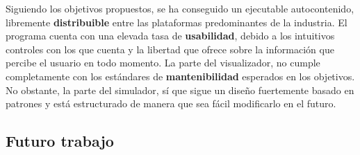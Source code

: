 \documentclass[12pt,a4paper,openright,oneside]{article}
\numberwithin{equation}{section}
\theoremstyle{definition}
\begin{document}
Siguiendo los objetivos propuestos, se ha conseguido un ejecutable autocontenido, libremente \textbf{distribuible} entre las plataformas predominantes de la industria. 
El programa cuenta con una elevada tasa de \textbf{usabilidad}, debido a los intuitivos controles con los que cuenta y la  libertad que ofrece sobre la información que percibe el usuario en todo momento. La parte del visualizador, no cumple completamente con los estándares de \textbf{mantenibilidad} esperados en los objetivos. No obstante, la parte del simulador, sí que sigue un diseño fuertemente basado en patrones y está estructurado de manera que sea fácil  modificarlo en el futuro.

\subsection{Futuro trabajo}
\end{document}
